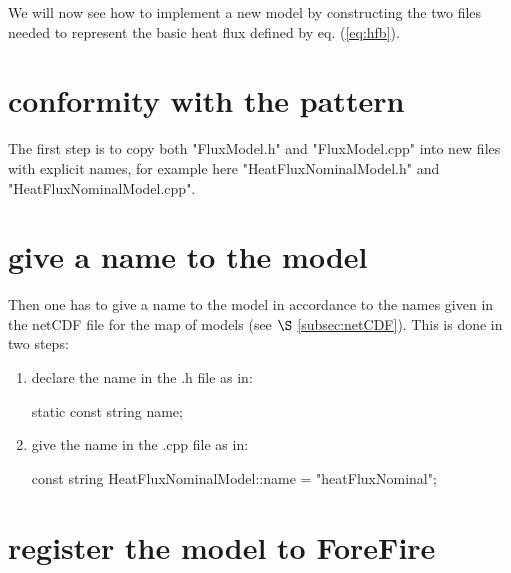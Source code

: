 We will now see how to implement a new model by constructing the two files needed to represent the basic heat flux defined by eq. (\ref{eq:hfb}).

\section{conformity with the pattern}

The first step is to copy both "FluxModel.h" and "FluxModel.cpp" into new files with explicit names, for example here "HeatFluxNominalModel.h" and "HeatFluxNominalModel.cpp".

\begin{center}
\end{center}

\section{give a name to the model}

Then one has to give a name to the model in accordance to the names given in the netCDF file for the map of models (see $\S$ \ref{subsec:netCDF}). This is done in two steps:
\begin{enumerate}
\item declare the name in the .h file as in: \\ \begin{center}static const string name;\end{center}
\item give the name in the .cpp file as in: \\ \begin{center}const string HeatFluxNominalModel::name = "heatFluxNominal";\end{center}
\end{enumerate}

\section{register the model to ForeFire}

